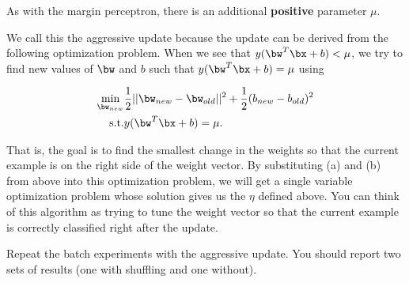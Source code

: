 \begin{enumerate}
  As with the margin perceptron, there is an additional {\bf positive}
  parameter $\mu$. 

  We call this the aggressive update because the update can be derived
  from the following optimization problem. When we see that
  $y(\bw^T\bx +b) < \mu$, we try to find new values of $\bw$ and $b$
  such that $y(\bw^T\bx +b) = \mu$ using 

  \begin{eqnarray*}
    \min_{\bw_{new}} & \frac{1}{2} ||\bw_{new} - \bw_{old}||^2 +\frac{1}{2}(b_{new} - b_{old})^2 \\
      \mbox{s.t.} & y(\bw^T\bx +b) = \mu.
  \end{eqnarray*}

  That is, the goal is to find the smallest change in the weights so
  that the current example is on the right side of the weight vector.
  By substituting (a) and (b) from above into this optimization
  problem, we will get a single variable optimization problem whose
  solution gives us the $\eta$ defined above. You can think of this
  algorithm as trying to tune the weight vector so that the current
  example is correctly classified right after the update.

  Repeat the batch experiments with the aggressive update. You should
  report two sets of results (one with shuffling and one without).

\end{enumerate}


